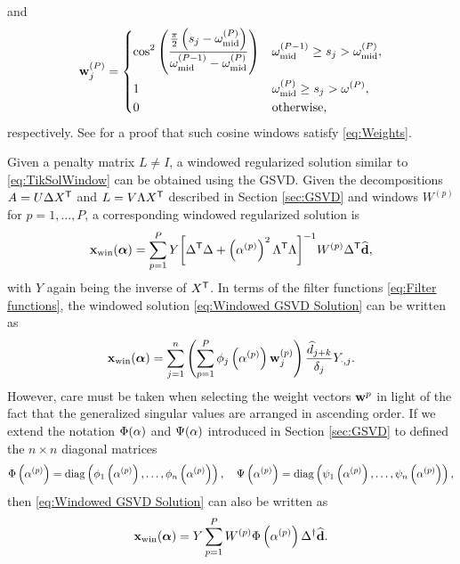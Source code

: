 \documentclass[12pt]{article}
\begin{document}
and
\begin{equation}
\label{eq:Last cosine window}
    \mathbf{w}_j^{(P)} = \begin{dcases}
    \cos^2\left(\frac{\frac{\pi}{2}\left(s_j - \omega_{\text{mid}}^{(P)}\right)}{\omega_{\text{mid}}^{(P-1)} - \omega_{\text{mid}}^{(P)}}\right) & \omega_{\text{mid}}^{(P-1)} \geq s_j > \omega_{\text{mid}}^{(P)}, \\
    1 & \omega_{\text{mid}}^{(P)} \geq s_j > \omega^{(P)}, \\
    0 & \text{otherwise,}
    \end{dcases}
\end{equation}
respectively. See \cite{Byrne} for a proof that such cosine windows satisfy \eqref{eq:Weights}. \par
Given a penalty matrix $L \neq I$, a windowed regularized solution similar to \eqref{eq:TikSolWindow} can be obtained using the GSVD. Given the decompositions $A = U\Delta{X}^\mathsf{T}$ and $L = V\Lambda{X}^\mathsf{T}$ described in Section \ref{sec:GSVD} and windows $W^{(p)}$ for $p = 1,\ldots,P$, a corresponding windowed regularized solution is
\begin{equation}
\label{eq:Windowed GSVD Solution}
    \mathbf{x}_{\text{win}}(\bm{\alpha}) = \sum_{p=1}^P Y{\left[{\Delta}^\mathsf{T}\Delta + \left(\alpha^{(p)}\right)^2 {\Lambda}^\mathsf{T}\Lambda\right]}^{-1}W^{(p)}{\Delta}^\mathsf{T}\widehat{\mathbf{d}},
\end{equation}
with $Y$ again being the inverse of ${X}^\mathsf{T}$. In terms of the filter functions \eqref{eq:Filter functions}, the windowed solution \eqref{eq:Windowed GSVD Solution} can be written as
\begin{equation}
\label{eq:Windowed GSVD Solution Sum}
    \mathbf{x}_{\text{win}}(\bm{\alpha}) = \sum_{j=1}^n \left(\sum_{p=1}^P \phi_j\left(\alpha^{(p)}\right)\mathbf{w}^{(p)}_{j}\right)  \frac{\widehat{d}_{j+k}}{\delta_j} Y_{\cdot,j}.
\end{equation}
However, care must be taken when selecting the weight vectors $\mathbf{w}^{p}$ in light of the fact that the generalized singular values are arranged in ascending order. If we extend the notation $\Phi(\alpha)$ and $\Psi(\alpha)$ introduced in Section \ref{sec:GSVD} to defined the $n \times n$ diagonal matrices 
\[\Phi\left(\alpha^{(p)}\right) = \operatorname{diag}\left(\phi_1\left(\alpha^{(p)}\right),\ldots,\phi_n\left(\alpha^{(p)}\right)\right), \quad  \Psi\left(\alpha^{(p)}\right) = \operatorname{diag}\left(\psi_1\left(\alpha^{(p)}\right),\ldots,\psi_n\left(\alpha^{(p)}\right)\right),\]
then \eqref{eq:Windowed GSVD Solution} can also be written as
\[\mathbf{x}_{\text{win}}(\bm{\alpha}) = Y\sum_{p=1}^P W^{(p)} \Phi\left(\alpha^{(p)}\right){\Delta}^\dagger\widehat{\mathbf{d}}.\]
\end{document}
